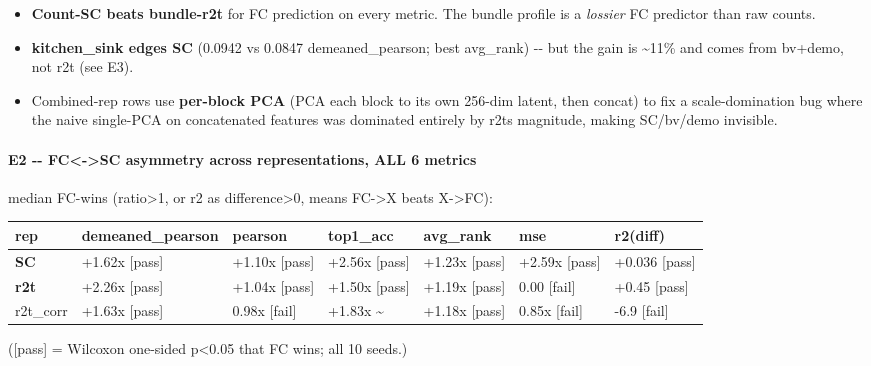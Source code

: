 \begin{itemize}
\tightlist
\item
  \textbf{Count-SC beats bundle-r2t} for FC prediction on every metric. The bundle profile is a \emph{lossier} FC predictor than raw counts.
\item
  \textbf{kitchen\_sink edges SC} (0.0942 vs 0.0847 demeaned\_pearson; best avg\_rank) -\/- but the gain is \textasciitilde11\% and comes from bv+demo, not r2t (see E3).
\item
  Combined-rep rows use \textbf{per-block PCA} (PCA each block to its own 256-dim latent, then concat) to fix a scale-domination bug where the naive single-PCA on concatenated features was dominated entirely by r2t\textquotesingle s magnitude, making SC/bv/demo invisible.
\end{itemize}

\paragraph{E2 -\/- FC\textless-\textgreater SC asymmetry across representations, ALL 6 metrics}\label{e2----fc-sc-asymmetry-across-representations-all-6-metrics}

median FC-wins (ratio\textgreater1, or r2 as difference\textgreater0, means FC-\textgreater X beats X-\textgreater FC):

{\def\LTcaptype{none} %
\begin{longtable}[]{@{}lllllll@{}}
\toprule\noalign{}
rep & demeaned\_pearson & pearson & top1\_acc & avg\_rank & mse & r2(diff) \\
\midrule\noalign{}
\endhead
\bottomrule\noalign{}
\endlastfoot
\textbf{SC} & +1.62x {[}pass{]} & +1.10x {[}pass{]} & +2.56x {[}pass{]} & +1.23x {[}pass{]} & +2.59x {[}pass{]} & +0.036 {[}pass{]} \\
\textbf{r2t} & +2.26x {[}pass{]} & +1.04x {[}pass{]} & +1.50x {[}pass{]} & +1.19x {[}pass{]} & 0.00 {[}fail{]} & +0.45 {[}pass{]} \\
r2t\_corr & +1.63x {[}pass{]} & 0.98x {[}fail{]} & +1.83x \textasciitilde{} & +1.18x {[}pass{]} & 0.85x {[}fail{]} & -6.9 {[}fail{]} \\
\end{longtable}
}

({[}pass{]} = Wilcoxon one-sided p\textless0.05 that FC wins; all 10 seeds.)

